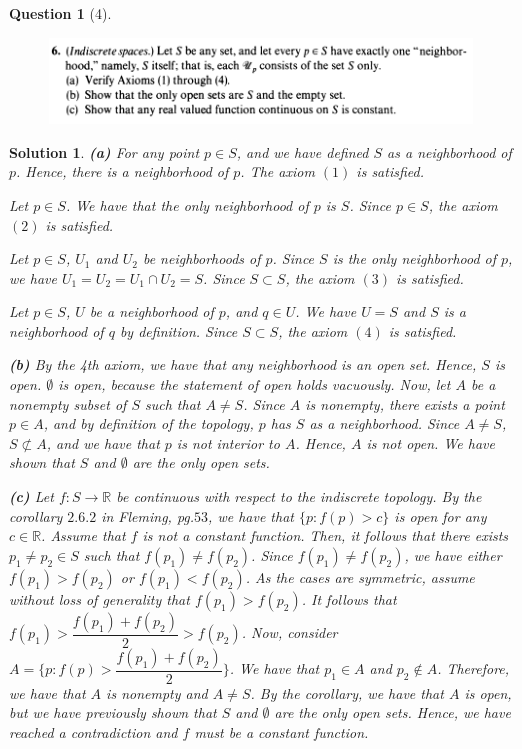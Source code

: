 \documentclass{article} %
\theoremstyle{quest}
\newtheorem*{question}{Question}
\newtheorem*{solution}{Solution}
\begin{document}
\newpage

\begin{question}[4]
\hfill
\begin{figure}[h!]
  \centering
    \includegraphics[width=1\textwidth]{MA-2-26-6.png}
\end{figure}
\end{question}
\begin{solution}
\textbf{(a)} For any point $p \in S$, and we have defined
$S$ as a neighborhood of $p$. Hence, there is a neighborhood of $p$.  
The axiom $(1)$ is satisfied.

\smallskip 
Let $p \in S$. We have that the only neighborhood of $p$ is $S$. Since $p \in S$, the
axiom $(2)$ is satisfied.

\smallskip

Let $p \in S$, $U_1$ and $U_2$ be neighborhoods of $p$.
Since $S$ is the only neighborhood of $p$, we have $U_1 = U_2 = U_1 \cap U_2 = S$. 
Since $S \subset S$, the axiom $(3)$ is satisfied. 

\smallskip

Let $p \in S$, $U$ be a neighborhood of $p$, and $q \in U$. We have $U =S$ and $S$
is a neighborhood of $q$ by definition. Since $S \subset S$, the axiom $(4)$ is satisfied. 

\bigskip

\textbf{(b)}
By the 4th axiom, we have that any neighborhood is an open set. Hence, $S$ is open. 
$\emptyset$ is open, because the statement of open holds vacuously. Now, let $A$ be 
a nonempty subset of $S$ such that $A \neq S$. Since $A$ is nonempty, there exists
a point $p \in A$, and by definition of the topology, $p$ has $S$ as a neighborhood. 
Since $A \neq S$, $S \not\subset A$, and we have that $p$ is not interior to $A$.
Hence, $A$ is not open. We have shown that $S$ and $\emptyset$ are the only open sets.

\bigskip

\textbf{(c)} Let $f:S \to \mathbb{R}$ be continuous with respect to the indiscrete topology.
By the corollary $2.6.2$ in Fleming, pg.$53$, we have that $\{p : f(p) > c \}$ is open
for any $c \in \mathbb{R}$. Assume that $f$ is not a constant function. Then, it follows
that there exists $p_1 \neq p_2 \in S$ such that $f(p_1) \neq f(p_2)$. Since $f(p_1) 
\neq f(p_2)$, we have either $f(p_1) > f(p_2)$ or $f(p_1) < f(p_2)$. As the cases are
symmetric, assume without loss of generality that $f(p_1) > f(p_2)$. It follows that 
$f(p_1) > \dfrac{f(p_1) + f(p_2)}{2} > f(p_2)$. Now, consider $A = \{ p : f(p) > 
\dfrac{f(p_1) + f(p_2)}{2} \}$. We have that $p_1 \in A$ and $p_2 \not\in A$. Therefore,
we have that $A$ is nonempty and $A \neq S$. By the corollary, we have that $A$ is open, but
we have previously shown that $S$ and $\emptyset$ are the only open sets. Hence, we have
reached a contradiction and $f$ must be a constant function.


\end{solution}
\end{document}
